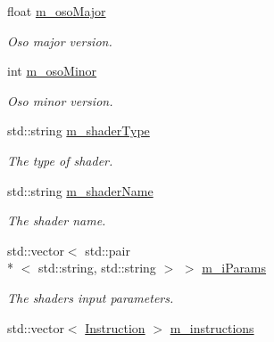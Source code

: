 \begin{DoxyCompactItemize}
\item 
\hypertarget{class_oso_reader_aa85bc116665b7d04446ae5600181ddf8}{float \hyperlink{class_oso_reader_aa85bc116665b7d04446ae5600181ddf8}{m\-\_\-oso\-Major}}\label{class_oso_reader_aa85bc116665b7d04446ae5600181ddf8}

\begin{DoxyCompactList}\small\item\em Oso major version. \end{DoxyCompactList}\item 
\hypertarget{class_oso_reader_a1cc6e749a85a487323ec82c7709691c5}{int \hyperlink{class_oso_reader_a1cc6e749a85a487323ec82c7709691c5}{m\-\_\-oso\-Minor}}\label{class_oso_reader_a1cc6e749a85a487323ec82c7709691c5}

\begin{DoxyCompactList}\small\item\em Oso minor version. \end{DoxyCompactList}\item 
\hypertarget{class_oso_reader_a0ad8d3f177c8c8269afe76c53db54b9c}{std\-::string \hyperlink{class_oso_reader_a0ad8d3f177c8c8269afe76c53db54b9c}{m\-\_\-shader\-Type}}\label{class_oso_reader_a0ad8d3f177c8c8269afe76c53db54b9c}

\begin{DoxyCompactList}\small\item\em The type of shader. \end{DoxyCompactList}\item 
\hypertarget{class_oso_reader_a0539542488b827db046a9acf105f7c49}{std\-::string \hyperlink{class_oso_reader_a0539542488b827db046a9acf105f7c49}{m\-\_\-shader\-Name}}\label{class_oso_reader_a0539542488b827db046a9acf105f7c49}

\begin{DoxyCompactList}\small\item\em The shader name. \end{DoxyCompactList}\item 
\hypertarget{class_oso_reader_a95df7244a3e56ade2e59d9fdf89a15e2}{std\-::vector$<$ std\-::pair\\*
$<$ std\-::string, std\-::string $>$ $>$ \hyperlink{class_oso_reader_a95df7244a3e56ade2e59d9fdf89a15e2}{m\-\_\-i\-Params}}\label{class_oso_reader_a95df7244a3e56ade2e59d9fdf89a15e2}

\begin{DoxyCompactList}\small\item\em The shaders input parameters. \end{DoxyCompactList}\item 
\hypertarget{class_oso_reader_af1afa408ccfb8db99069b5f807433e5f}{std\-::vector$<$ \hyperlink{struct_instruction}{Instruction} $>$ \hyperlink{class_oso_reader_af1afa408ccfb8db99069b5f807433e5f}{m\-\_\-instructions}}\label{class_oso_reader_af1afa408ccfb8db99069b5f807433e5f}


\end{DoxyCompactItemize}
